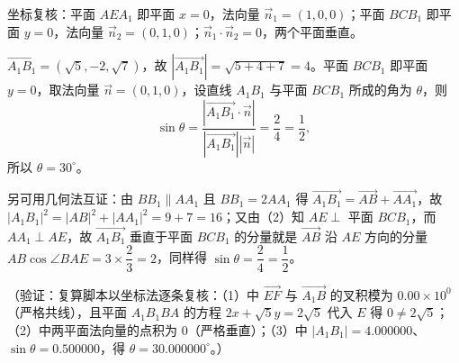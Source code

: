 \begin{answer}
坐标复核：平面 \(AEA_1\) 即平面 \(x=0\)，法向量 \(\vec{n}_1=(1,0,0)\)；平面 \(BCB_1\) 即平面 \(y=0\)，法向量 \(\vec{n}_2=(0,1,0)\)；\(\vec{n}_1\cdot\vec{n}_2=0\)，两个平面垂直。

\(\overrightarrow{A_1B_1}=(\sqrt{5},-2,\sqrt{7})\)，故 \(|\overrightarrow{A_1B_1}|=\sqrt{5+4+7}=4\)。平面 \(BCB_1\) 即平面 \(y=0\)，取法向量 \(\vec{n}=(0,1,0)\)，设直线 \(A_1B_1\) 与平面 \(BCB_1\) 所成的角为 \(\theta\)，则
\nopagebreak[4]
\[
\sin\theta=\dfrac{|\overrightarrow{A_1B_1}\cdot\vec{n}|}{|\overrightarrow{A_1B_1}||\vec{n}|}=\dfrac{2}{4}=\dfrac{1}{2},
\]
所以 \(\theta=30^\circ\)。

另可用几何法互证：由 \(BB_1\parallel AA_1\) 且 \(BB_1=2AA_1\) 得 \(\overrightarrow{A_1B_1}=\overrightarrow{AB}+\overrightarrow{AA_1}\)，故 \(|A_1B_1|^{2}=|AB|^{2}+|AA_1|^{2}=9+7=16\)；又由（2）知 \(AE\perp\) 平面 \(BCB_1\)，而 \(AA_1\perp AE\)，故 \(\overrightarrow{A_1B_1}\) 垂直于平面 \(BCB_1\) 的分量就是 \(\overrightarrow{AB}\) 沿 \(AE\) 方向的分量 \(AB\cos\angle BAE=3\times\dfrac{2}{3}=2\)，同样得 \(\sin\theta=\dfrac{2}{4}=\dfrac{1}{2}\)。

（验证：复算脚本以坐标法逐条复核：（1）中 \(\overrightarrow{EF}\) 与 \(\overrightarrow{A_1B}\) 的叉积模为 \(0.00\times10^{0}\)（严格共线），且平面 \(A_1B_1BA\) 的方程 \(2x+\sqrt{5}y=2\sqrt{5}\) 代入 \(E\) 得 \(0\ne2\sqrt{5}\)；（2）中两平面法向量的点积为 \(0\)（严格垂直）；（3）中 \(|A_1B_1|=4.000000\)、\(\sin\theta=0.500000\)，得 \(\theta=30.000000^\circ\)。）




\end{answer}
